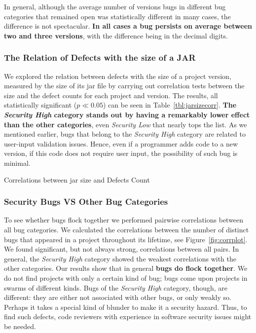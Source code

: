 \documentclass{sig-alternate}
\begin{document}
In general, although the average number of versions bugs in different
bug categories that remained open was statistically different in many
cases, the difference is not spectacular. \textbf{In all cases a bug persists
on average between two and three versions}, with the difference being
in the decimal digits.

\subsubsection{The Relation of Defects with the size of a JAR}

We explored the relation between defects with the size of a project
version, measured by the size of its {\sc jar} file by carrying out
correlation tests between the size and the defect counts for each
project and version. The results, all statistically significant ($p
\ll 0.05$) can be seen in Table~\ref{tbl:jarsizecorr}.  \textbf{The {\it
  Security High} category stands out by having a remarkably lower
effect than the other categories}, even {\it Security Low} that nearly
tops the list. As we mentioned earlier, bugs that belong to the
{\it Security High} category are related to
user-input validation issues. Hence, even if a programmer adds
code to a new version, if this code does not require user
input, the possibility of such bug is minimal. 

\begin{table}[hbt]
    \centering
    \caption{Correlations between {\sc jar} size and Defects Count}
    \label{tbl:jarsizecorr}
    
\end{table}

\subsubsection{Security Bugs VS Other Bug Categories}

To see whether bugs flock together we performed pairwise correlations
between all bug categories. We calculated the correlations between the
number of distinct bugs that appeared in a project throughout its
lifetime, see Figure~\ref{fig:corrplot}. We found significant, but not always
strong, correlations between all pairs. In general, the {\it Security
  High} category showed the weakest correlations with the other
categories. Our results show that in general \textbf{bugs do flock together}.
We do not find projects with only a certain kind of bug; bugs come
upon projects in swarms of different kinds. Bugs of the {\it Security
  High} category, though, are different: they are either not
associated with other bugs, or only weakly so. Perhaps it takes a
special kind of blunder to make it a security hazard. Thus, to find such
defects, code reviewers with experience in software security
issues might be needed.
\end{document}
